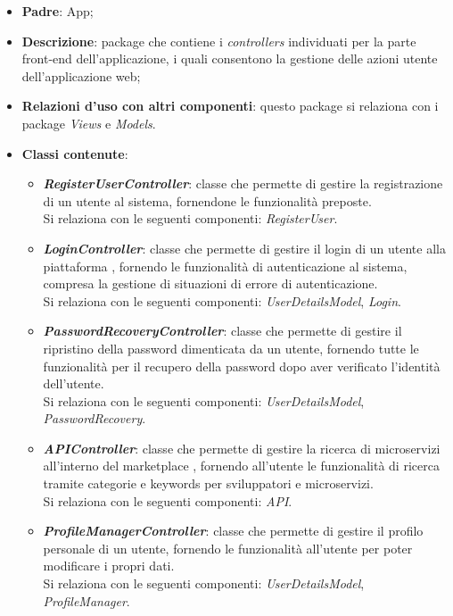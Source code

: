 \begin{itemize}
	\item \textbf{Padre}: App;
	
	\item \textbf{Descrizione}: package che contiene i \textit{controllers} individuati per la parte front-end
	dell'applicazione, i quali consentono la gestione delle azioni utente dell'applicazione web;
	
	\item \textbf{Relazioni d’uso con altri componenti}: questo package si relaziona con i package \textit{Views} e \textit{Models}.
	
	\item \textbf{Classi contenute}:
	\begin{itemize}
		
		\item \textbf{\textit{RegisterUserController}}: classe che permette di gestire la registrazione di un utente al sistema, fornendone le funzionalità preposte.\\
		Si relaziona con le seguenti componenti: \textit{RegisterUser}.
		
		\item \textbf{\textit{LoginController}}: classe che permette di gestire il login di un utente alla piattaforma \progetto, fornendo le funzionalità di autenticazione al sistema, compresa la gestione di	situazioni di errore di autenticazione.\\
		Si relaziona con le seguenti componenti: \textit{UserDetailsModel}, \textit{Login}.
		
		\item \textbf{\textit{PasswordRecoveryController}}: classe che permette di gestire il ripristino della password dimenticata da un utente, fornendo tutte le funzionalità per il recupero della password dopo aver verificato l'identità dell'utente.\\
		Si relaziona con le seguenti componenti: \textit{UserDetailsModel}, \textit{PasswordRecovery}.
		
		\item \textbf{\textit{APIController}}: classe che permette di gestire la ricerca di microservizi all'interno del marketplace \progetto, fornendo all'utente le funzionalità di ricerca tramite categorie e keywords per sviluppatori e microservizi.\\
		Si relaziona con le seguenti componenti: \textit{API}.
		
		\item \textbf{\textit{ProfileManagerController}}: classe che permette di gestire il profilo personale di un utente, fornendo le funzionalità all'utente per poter modificare i propri dati.\\
		Si relaziona con le seguenti componenti: \textit{UserDetailsModel}, \textit{ProfileManager}.
		

\end{itemize}
\end{itemize}
